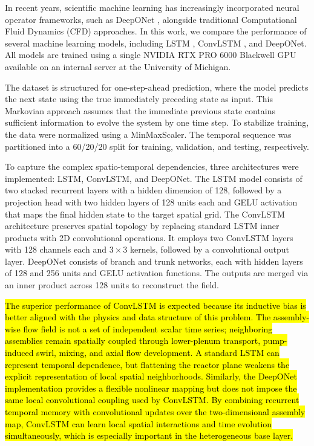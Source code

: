 \documentclass[review]{elsarticle}
\theoremstyle{definition}
\theoremstyle{definition}
\theoremstyle{remark}
\begin{document}
In recent years, scientific machine learning has increasingly incorporated neural operator frameworks, such as DeepONet \cite{Lu2021DeepONet}, alongside traditional Computational Fluid Dynamics (CFD) approaches. In this work, we compare the performance of several machine learning models, including LSTM \cite{hochreiter1997long}, ConvLSTM \cite{shi2015convolutional}, and DeepONet. All models are trained using a single NVIDIA RTX PRO 6000 Blackwell GPU available on an internal server at the University of Michigan.

The dataset is structured for one-step-ahead prediction, where the model predicts the next state using the true immediately preceding state as input. This Markovian approach assumes that the immediate previous state contains sufficient information to evolve the system by one time step. To stabilize training, the data were normalized using a MinMaxScaler. The temporal sequence was partitioned into a 60/20/20 split for training, validation, and testing, respectively.

To capture the complex spatio-temporal dependencies, three architectures were implemented: LSTM, ConvLSTM, and DeepONet. The LSTM model consists of two stacked recurrent layers with a hidden dimension of 128, followed by a projection head with two hidden layers of 128 units each and GELU activation that maps the final hidden state to the target spatial grid. The ConvLSTM architecture preserves spatial topology by replacing standard LSTM inner products with 2D convolutional operations. It employs two ConvLSTM layers with 128 channels each and $3 \times 3$ kernels, followed by a convolutional output layer. DeepONet consists of branch and trunk networks, each with hidden layers of 128 and 256 units and GELU activation functions. The outputs are merged via an inner product across 128 units to reconstruct the field.

\hl{The superior performance of ConvLSTM is expected because its inductive bias is better aligned with the physics and data structure of this problem. The assembly-wise flow field is not a set of independent scalar time series; neighboring assemblies remain spatially coupled through lower-plenum transport, pump-induced swirl, mixing, and axial flow development. A standard LSTM can represent temporal dependence, but flattening the reactor plane weakens the explicit representation of local spatial neighborhoods. Similarly, the DeepONet implementation provides a flexible nonlinear mapping but does not impose the same local convolutional coupling used by ConvLSTM. By combining recurrent temporal memory with convolutional updates over the two-dimensional assembly map, ConvLSTM can learn local spatial interactions and time evolution simultaneously, which is especially important in the heterogeneous base layer.}
\end{document}
